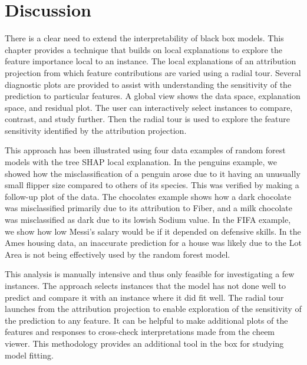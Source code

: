 \documentclass[11pt,twoside]{article}
\begin{document}
\hypertarget{sec:cheemdiscussion}{%
\section{Discussion}\label{sec:cheemdiscussion}}

There is a clear need to extend the interpretability of black box models. This chapter provides a technique that builds on local explanations to explore the feature importance local to an instance. The local explanations of an attribution projection from which feature contributions are varied using a radial tour. Several diagnostic plots are provided to assist with understanding the sensitivity of the prediction to particular features. A global view shows the data space, explanation space, and residual plot. The user can interactively select instances to compare, contrast, and study further. Then the radial tour is used to explore the feature sensitivity identified by the attribution projection.

This approach has been illustrated using four data examples of random forest models with the tree SHAP local explanation. In the penguins example, we showed how the misclassification of a penguin arose due to it having an unusually small flipper size compared to others of its species. This was verified by making a follow-up plot of the data. The chocolates example shows how a dark chocolate was misclassified primarily due to its attribution to Fiber, and a milk chocolate was misclassified as dark due to its lowish Sodium value. In the FIFA example, we show how low Messi's salary would be if it depended on defensive skills. In the Ames housing data, an inaccurate prediction for a house was likely due to the Lot Area is not being effectively used by the random forest model.

This analysis is manually intensive and thus only feasible for investigating a few instances. The approach selects instances that the model has not done well to predict and compare it with an instance where it did fit well. The radial tour launches from the attribution projection to enable exploration of the sensitivity of the prediction to any feature. It can be helpful to make additional plots of the features and responses to cross-check interpretations made from the cheem viewer. This methodology provides an additional tool in the box for studying model fitting.
\end{document}
